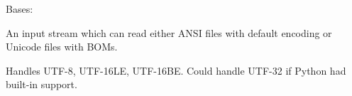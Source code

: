 \documentclass[a4paper,10pt,english]{sphinxmanual}
\begin{document}

\begin{fulllineitems}
\label{\detokenize{commands/apidoc/src:src.pyconf.ConfigInputStream}}
Bases: 

An input stream which can read either ANSI files with default encoding
or Unicode files with BOMs.

Handles UTF-8, UTF-16LE, UTF-16BE. Could handle UTF-32 if Python had
built-in support.

\begin{fulllineitems}
\label{\detokenize{commands/apidoc/src:src.pyconf.ConfigInputStream.close}}
\end{fulllineitems}


\begin{fulllineitems}
\label{\detokenize{commands/apidoc/src:src.pyconf.ConfigInputStream.read}}
\end{fulllineitems}


\begin{fulllineitems}
\label{\detokenize{commands/apidoc/src:src.pyconf.ConfigInputStream.readline}}
\end{fulllineitems}


\end{fulllineitems}

\end{document}
